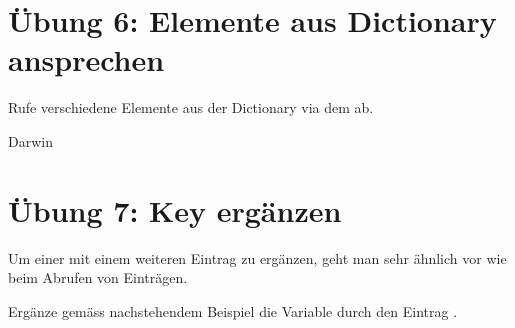 \documentclass[letterpaper,10pt,english]{sphinxmanual}
\begin{document}
\begin{sphinxVerbatim}[commandchars=\\\{\}]
     
\end{sphinxVerbatim}


\section{Übung 6: Elemente aus Dictionary ansprechen}
\label{\detokenize{01_02_Python_Basics:ubung-6-elemente-aus-dictionary-ansprechen}}
Rufe verschiedene Elemente aus der Dictionary via dem  ab.

\begin{sphinxVerbatim}[commandchars=\\\{\}]
\PYG{p}{[}\PYG{p}{]}

\PYG{p}{[}\PYG{p}{]}
\end{sphinxVerbatim}

\begin{sphinxVerbatim}[commandchars=\\\{\}]
\PYGZsq{}Darwin\PYGZsq{}
\end{sphinxVerbatim}


\section{Übung 7: Key ergänzen}
\label{\detokenize{01_02_Python_Basics:ubung-7-key-erganzen}}
Um einer  mit einem weiteren Eintrag zu ergänzen, geht man sehr ähnlich vor wie beim Abrufen von Einträgen.

\begin{sphinxVerbatim}[commandchars=\\\{\}]
\PYG{p}{[}\PYG{p}{]}   
\end{sphinxVerbatim}

Ergänze gemäss nachstehendem Beispiel die Variable  durch den Eintrag .
\end{document}
